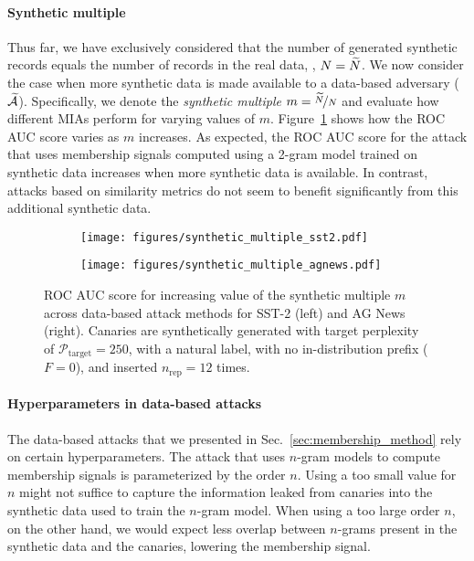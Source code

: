 
\paragraph{Synthetic multiple} 
Thus far, we have exclusively considered that the number of generated synthetic records equals the number of records in the real data, \ie, $N = {\widetilde{N}}$. We now consider the case when more synthetic data is made available to a data-based adversary (${\widetilde{\mathcal{A}}}$). Specifically, we denote the \emph{synthetic multiple} $m = \nicefrac{{\widetilde{N}}}{N}$ and evaluate how different MIAs perform for varying values of $m$.
%
Figure~\ref{fig:synthetic_multiple} shows how the ROC AUC score varies as $m$ increases. As expected, the ROC AUC score for the attack that uses membership signals computed using a 2-gram model trained on synthetic data increases when more synthetic data is available. In contrast, attacks based on similarity metrics do not seem to benefit significantly from this additional synthetic data.

\begin{figure}[htb]
  \centering
  \begin{subfigure}{0.4\textwidth}
    \centering
    \texttt{[image: figures/synthetic\_multiple\_sst2.pdf]}
  \end{subfigure}
  \hspace{0.05\textwidth}
  \begin{subfigure}{0.4\textwidth}
    \texttt{[image: figures/synthetic\_multiple\_agnews.pdf]}
  \end{subfigure}
  \caption{ROC AUC score for increasing value of the synthetic multiple $m$ across data-based attack methods for SST-2 (left) and AG News (right). Canaries are synthetically generated with target perplexity of $\mathcal{P}_{\textrm{target}}=250$,  with a natural label, with no in-distribution prefix ($F=0$), and inserted $n_\textrm{rep}=12$ times.} 
  \label{fig:synthetic_multiple}
\end{figure} 


\paragraph{Hyperparameters in data-based attacks}
The data-based attacks that we presented in Sec.~\ref{sec:membership_method} rely on certain hyperparameters.
%
The attack that uses $n$-gram models to compute membership signals is parameterized by the order $n$. Using a too small value for $n$ might not suffice to capture the information leaked from canaries into the synthetic data used to train the $n$-gram model. When using a too large order $n$, on the other hand, we would expect less overlap between $n$-grams present in the synthetic data and the canaries, lowering the membership signal.

